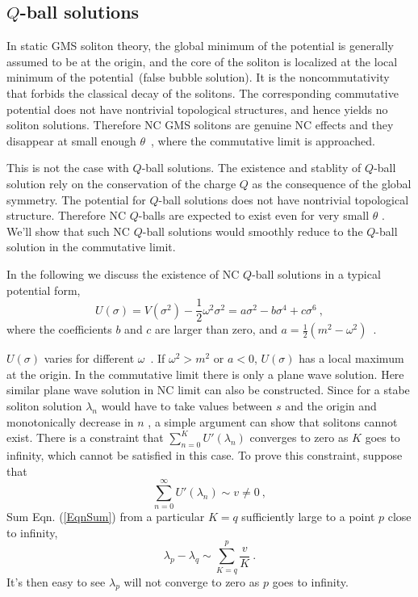 \documentclass[a4paper,a4paper]{article}
\begin{document}
\subsection{$Q$-ball solutions}

In static GMS soliton theory, the global minimum of the potential is
generally assumed to be at the origin, and the core of the soliton is
localized at the local minimum of the potential~(false bubble
solution). It is the noncommutativity that forbids the classical
decay of the solitons.  The corresponding commutative potential does
not have nontrivial topological structures, and hence yields no
soliton solutions. Therefore NC GMS solitons are genuine
NC effects and they disappear at small enough $\theta$\ ,
where the commutative limit is approached.

This is not the case with $Q$-ball solutions. The existence and
stablity of $Q$-ball solution rely on the conservation of the
charge $Q$ as the consequence of the global symmetry. The potential
for $Q$-ball solutions does not have nontrivial topological
structure. Therefore NC $Q$-balls are expected to exist even for very
small $\theta$ . We'll show that such NC $Q$-ball solutions would
smoothly reduce to the $Q$-ball solution in the commutative limit.

In the following we discuss the existence of NC $Q$-ball solutions in
a typical potential form, 
\begin{equation}
U(\sigma)=V(\sigma^2)-\frac
12\omega^2\sigma^2=a\sigma^2-b\sigma^4+c\sigma^6\ ,                                                \label{PotU}
\end{equation}
where the coefficients $b$ and $c$ are larger than zero, and $a=\frac
12(m^2-\omega^2)$\ . 

$U(\sigma)$ varies for different $\omega$\ . If
$\omega^2>m^2$ or $a<0$, $U(\sigma)$ has a local
maximum at the origin. In the commutative limit there is only a plane
wave solution.  Here similar plane wave solution in NC limit can also
be constructed.  Since for a stabe soliton solution $\lambda_n$ would have
to take values between $s$ and the origin and monotonically decrease in $n$
 \cite{Dur}, a simple argument can show that solitons cannot exist. 
There is a constraint that 
$\sum_{n=0}^K U'(\lambda_n)$
converges to zero as $K$ goes to infinity, which cannot be satisfied
in this case. To prove this constraint, suppose that
\begin{equation}
\sum_{n=0}^\infty U'(\lambda_n)\sim v\neq 0\ ,
\end{equation}
Sum Eqn. (\ref{EqnSum}) from a particular $K=q$ sufficiently large to
a point $p$ close to infinity,
\begin{equation}
\lambda_p-\lambda_q\sim \sum_{K=q}^{p}\frac vK\ .
\end{equation}
It's then easy to see $\lambda_p$ will not converge to zero as $p$
goes to infinity.
\end{document}
